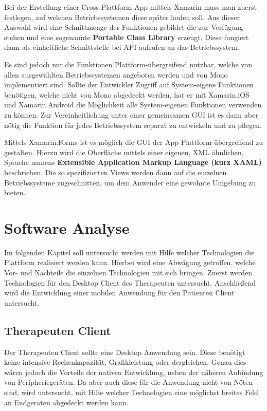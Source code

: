 Bei der Erstellung einer Cross Plattform App mittels Xamarin muss man zuerst festlegen, auf welchen Betriebssystemen diese später laufen soll. Aus dieser Auswahl wird eine Schnittmenge der Funktionen gebildet die zur Verfügung stehen und eine sogenannte \textbf{Portable Class Library} erzeugt. Diese fungiert dann als einheitliche Schnittstelle bei API aufrufen an das Betriebssystem.

Es sind jedoch nur die Funktionen Plattform-übergreifend nutzbar, welche von allen ausgewählten Betriebssystemen angeboten werden und von Mono implementiert sind. 
Sollte der Entwickler Zugriff auf System-eigene Funktionen benötigen, welche nicht von Mono abgedeckt werden, hat er mit Xamarin.iOS und Xamarin.Android die Möglichkeit alle System-eigenen Funktionen verwenden zu können. Zur Vereinheitlichung unter einer gemeinsamen GUI ist es dann aber nötig die Funktion für jedes Betriebssystem separat zu entwickeln und zu pflegen.

Mittels Xamarin.Forms ist es möglich die GUI der App Plattform-übergreifend zu gestalten. Hierzu wird die Oberfläche mittels einer eigenen, XML ähnlichen, Sprache namens \textbf{Extensible Application Markup Language (kurz XAML)} beschrieben. Die so spezifizierten Views werden dann auf die einzelnen Betriebssysteme zugeschnitten, um dem Anwender eine gewohnte Umgebung zu bieten. 

\section{Software Analyse} 
Im folgenden Kapitel soll untersucht werden mit Hilfe welcher Technologien die Plattform realisiert werden kann. Hierbei wird eine Abwägung getroffen, welche Vor- und Nachteile die einzelnen Technologien mit sich bringen. Zuerst werden Technologien für den Desktop Client des Therapeuten untersucht. Anschließend wird die Entwicklung einer mobilen Anwendung für den Patienten Client untersucht.

\subsection{Therapeuten Client}
Der Therapeuten Client sollte eine Desktop Anwendung sein. Diese benötigt keine intensive Rechenkapazität, Grafikleistung oder dergleichen.
Genau dies wären jedoch die Vorteile der nativen Entwicklung, neben der näheren Anbindung von Peripheriegeräten. Da aber auch diese für die Anwendung nicht von Nöten sind, wird untersucht, mit Hilfe welcher Technologien eine möglichst breites Feld an Endgeräten abgedeckt werden kann.

